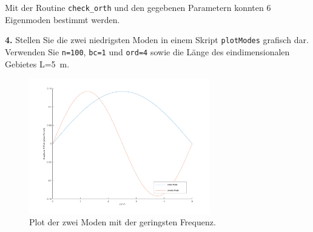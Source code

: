 \documentclass[Protokollheft.tex]{subfiles}
\begin{document}
	Mit der Routine \texttt{check\_orth} und den gegebenen Parametern konnten 6 Eigenmoden bestimmt werden. 
	
	\begin{framed}
		\noindent \textbf{4.} Stellen Sie die zwei niedrigsten Moden in einem Skript \lstinline{plotModes} grafisch dar.
		Verwenden Sie \lstinline{n=100}, \lstinline{bc=1} und \lstinline{ord=4} sowie die Länge des eindimensionalen Gebietes L=\SI{5}{m}.\label{exer:plotModes}
	\end{framed}
	
	\begin{figure}[h]
		\centering
		\includegraphics[trim = 20mm 15mm 20mm 15mm, clip, width=0.7\textwidth]{modes.pdf}
		\caption{Plot der zwei Moden mit der geringsten Frequenz.}
		
	\end{figure}
	
\end{document}
